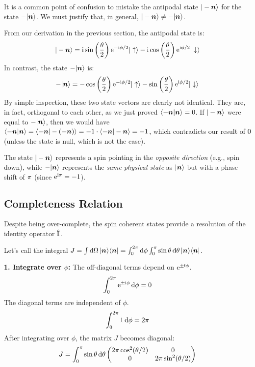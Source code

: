 It is a common point of confusion to mistake the antipodal state $|-\bm{n}\rangle$ for the state $-|\bm{n}\rangle$. We must justify that, in general, $|-\bm{n}\rangle \neq -|\bm{n}\rangle$.

From our derivation in the previous section, the antipodal state is:
\begin{equation}
    |-\bm{n}\rangle = \mathrm{i} \sin\left(\frac{\theta}{2}\right) \mathrm{e}^{-\mathrm{i}\phi/2} |\uparrow\rangle - \mathrm{i} \cos\left(\frac{\theta}{2}\right) \mathrm{e}^{\mathrm{i}\phi/2} |\downarrow\rangle
\end{equation}
In contrast, the state $-|\bm{n}\rangle$ is:
\begin{equation}
    -|\bm{n}\rangle = -\cos\left(\frac{\theta}{2}\right) \mathrm{e}^{-\mathrm{i}\phi/2} |\uparrow\rangle - \sin\left(\frac{\theta}{2}\right) \mathrm{e}^{\mathrm{i}\phi/2} |\downarrow\rangle
\end{equation}
By simple inspection, these two state vectors are clearly not identical. They are, in fact, orthogonal to each other, as we just proved $\langle-\bm{n}|\bm{n}\rangle=0$. If $|-\bm{n}\rangle$ were equal to $-|\bm{n}\rangle$, then we would have $\langle-\bm{n}|\bm{n}\rangle = \langle-\bm{n}|-(-\bm{n})\rangle = -1 \cdot \langle-\bm{n}|-\bm{n}\rangle = -1$, which contradicts our result of $0$ (unless the state is null, which is not the case).

The state $|-\bm{n}\rangle$ represents a spin pointing in the \textit{opposite direction} (e.g., spin down), while $-|\bm{n}\rangle$ represents the \textit{same physical state} as $|\bm{n}\rangle$ but with a phase shift of $\mathrm{\pi}$ (since $\mathrm{e}^{\mathrm{i}\mathrm{\pi}} = -1$).

\subsection{Completeness Relation}
Despite being over-complete, the spin coherent states provide a resolution of the identity operator $\hat{\mathbb{I}}$.

Let's call the integral $J = \int \mathrm{d}\Omega \, |\bm{n}\rangle\langle\bm{n}| = \int_0^{2\mathrm{\pi}} \mathrm{d}\phi \int_0^{\mathrm{\pi}} \sin\theta \, \mathrm{d}\theta \, |\bm{n}\rangle\langle\bm{n}|$.

\textbf{1. Integrate over $\phi$:}
The off-diagonal terms depend on $\mathrm{e}^{\pm\mathrm{i}\phi}$.
\begin{equation}
    \int_0^{2\mathrm{\pi}} \mathrm{e}^{\pm\mathrm{i}\phi} \, \mathrm{d}\phi = 0
\end{equation}
The diagonal terms are independent of $\phi$.
\begin{equation}
    \int_0^{2\mathrm{\pi}} 1 \, \mathrm{d}\phi = 2\mathrm{\pi}
\end{equation}
After integrating over $\phi$, the matrix $J$ becomes diagonal:
\begin{equation}
    J = \int_0^{\mathrm{\pi}} \sin\theta \, \mathrm{d}\theta
    \begin{pmatrix}
    2\mathrm{\pi} \cos^2(\theta/2) & 0 \\
    0 & 2\mathrm{\pi} \sin^2(\theta/2)
    \end{pmatrix}
\end{equation}

